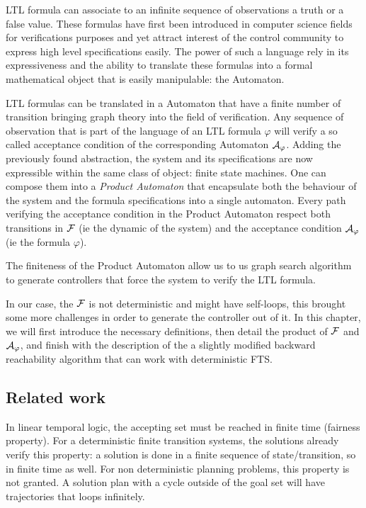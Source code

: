 LTL formula can associate to an infinite sequence of observations a truth or a false value. These formulas have first been introduced in computer science fields for verifications purposes and yet attract interest of the control community to express high level specifications easily.
The power of such a language rely in its expressiveness and the ability to translate these formulas into a formal mathematical object that is easily manipulable: the \buchi{} Automaton.

LTL formulas can be translated in a \buchi{} Automaton that have a finite number of transition bringing graph theory into the field of verification.
Any sequence of observation that is part of the language of an LTL formula $\varphi$ will verify a so called acceptance condition of the corresponding \buchi{} Automaton $\mathcal{A}_\varphi$.
Adding the previously found abstraction, the system and its specifications are now expressible within the same class of object: finite state machines.
One can compose them into a \textit{Product Automaton} that encapsulate both the behaviour of the system and the formula specifications into a single automaton.
Every path verifying the acceptance condition in the Product Automaton respect both transitions in $\mathcal{F}$ (ie the dynamic of the system) and the acceptance condition $\mathcal{A}_\varphi$ (ie the formula $\varphi$).

The finiteness of the Product Automaton allow us to us graph search algorithm to generate controllers that force the system to verify the LTL formula.

In our case, the $\mathcal{F}$ is not deterministic and might have self-loops, this brought some more challenges in order to generate the controller out of it.
In this chapter, we will first introduce the necessary definitions, then detail the product of $\mathcal{F}$ and $\mathcal{A}_\varphi$, and finish with the description of the a slightly modified backward reachability algorithm that can work with deterministic FTS.

\subsection{Related work}
In linear temporal logic, the accepting set must be reached in finite time (fairness property). For a deterministic finite transition systems, the solutions already verify this property: a solution is done in a finite sequence of state/transition, so in finite time as well.
For non deterministic planning problems, this property is not granted. A solution plan with a cycle outside of the goal set will have trajectories that loops infinitely.

